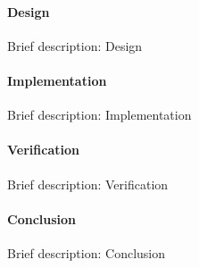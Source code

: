 		\paragraph{Design}

Brief description: Design

		\paragraph{Implementation}

Brief description: Implementation

		\paragraph{Verification}

Brief description: Verification

		\paragraph{Conclusion}

Brief description: Conclusion

